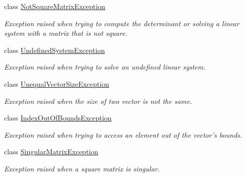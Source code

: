 \begin{CompactItemize}
class \hyperlink{classgrassmann_1_1NotSquareMatrixException}{NotSquareMatrixException}
\begin{CompactList}\small\item\em Exception raised when trying to compute the determinant or solving a linear system with a matrix that is not square. \item\end{CompactList}\item 
class \hyperlink{classgrassmann_1_1UndefinedSystemException}{UndefinedSystemException}
\begin{CompactList}\small\item\em Exception raised when trying to solve an undefined linear system. \item\end{CompactList}\item 
class \hyperlink{classgrassmann_1_1UnequalVectorSizeException}{UnequalVectorSizeException}
\begin{CompactList}\small\item\em Exception raised when the size of two vector is not the same. \item\end{CompactList}\item 
class \hyperlink{classgrassmann_1_1IndexOutOfBoundsException}{IndexOutOfBoundsException}
\begin{CompactList}\small\item\em Exception raised when trying to access an element out of the vector's bounds. \item\end{CompactList}\item 
class \hyperlink{classgrassmann_1_1SingularMatrixException}{SingularMatrixException}
\begin{CompactList}\small\item\em Exception raised when a square matrix is singular. \item\end{CompactList}\end{CompactItemize}
